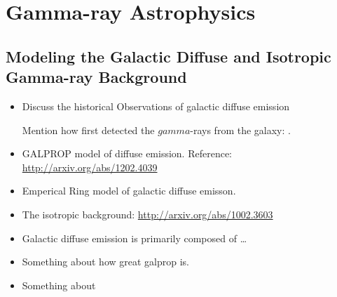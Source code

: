 
\chapter{Gamma-ray Astrophysics}














\section{Modeling the Galactic Diffuse and Isotropic Gamma-ray Background}


\begin{itemize}
  \item Discuss the historical Observations of galactic diffuse emission

    Mention how  first detected the $gamma$-rays from the galaxy: .


  \item GALPROP model of diffuse emission.
  Reference: \url{http://arxiv.org/abs/1202.4039}
  \item Emperical Ring model of galactic diffuse emisson.
  \item The isotropic background: \url{http://arxiv.org/abs/1002.3603}
\end{itemize}

\begin{itemize}
  \item Galactic diffuse emission is primarily composed of \ldots
  \item Something about how great galprop is.
  \item Something about
\end{itemize}


